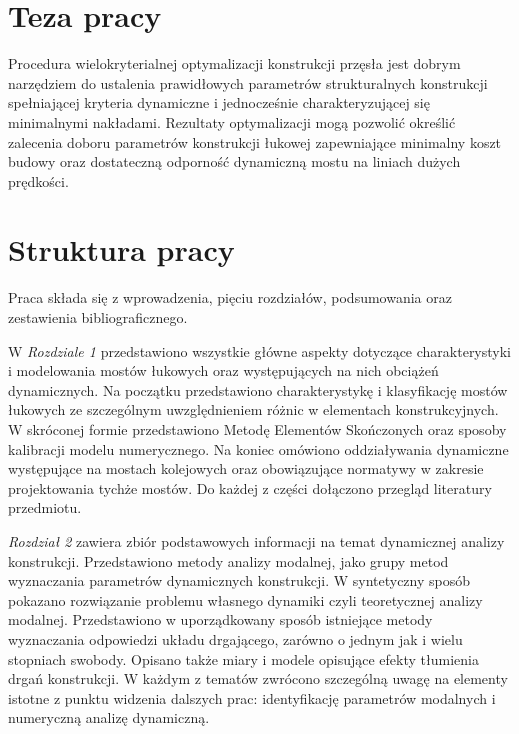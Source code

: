 \section*{Teza pracy}

Procedura wielokryterialnej optymalizacji konstrukcji przęsła jest dobrym narzędziem do ustalenia prawidłowych parametrów strukturalnych konstrukcji spełniającej kryteria dynamiczne i jednocześnie charakteryzującej się minimalnymi nakładami. Rezultaty optymalizacji mogą pozwolić określić zalecenia doboru parametrów konstrukcji łukowej zapewniające minimalny koszt budowy oraz dostateczną odporność dynamiczną mostu na liniach dużych prędkości.




\section*{Struktura pracy}
Praca składa się z wprowadzenia, pięciu rozdziałów, podsumowania oraz zestawienia bibliograficznego. 

W \textit{Rozdziale 1} przedstawiono wszystkie główne aspekty dotyczące charakterystyki i modelowania mostów łukowych oraz występujących na nich obciążeń dynamicznych. Na początku przedstawiono charakterystykę i klasyfikację mostów łukowych ze szczególnym uwzględnieniem różnic w elementach konstrukcyjnych. W skróconej formie przedstawiono Metodę Elementów Skończonych oraz sposoby kalibracji modelu numerycznego. Na koniec omówiono oddziaływania dynamiczne występujące na mostach kolejowych oraz obowiązujące normatywy w zakresie projektowania tychże mostów. Do każdej z części dołączono przegląd literatury przedmiotu.

\textit{Rozdział 2} zawiera zbiór podstawowych informacji na temat dynamicznej analizy konstrukcji. Przedstawiono metody analizy modalnej, jako grupy metod wyznaczania parametrów dynamicznych konstrukcji. W syntetyczny sposób pokazano rozwiązanie problemu własnego dynamiki czyli teoretycznej analizy modalnej. Przedstawiono w uporządkowany sposób istniejące metody wyznaczania odpowiedzi układu drgającego, zarówno o jednym jak i wielu stopniach swobody. Opisano także miary i modele opisujące efekty tłumienia drgań konstrukcji. W każdym z tematów zwrócono szczególną uwagę na elementy istotne z punktu widzenia dalszych prac: identyfikację parametrów modalnych i numeryczną analizę dynamiczną.

